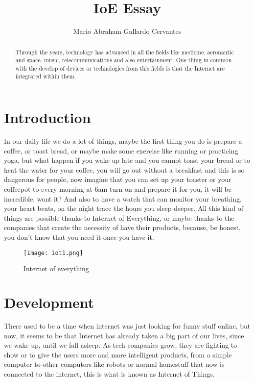 \documentclass{IEEEtran}
\title{IoE Essay}
\author{Mario Abraham Gallardo Cervantes}
\begin{document}
\maketitle

\begin{abstract}
Through the years, technology has advanced in all the fields like medicine, aeronautic and space, music, telecommunications and also entertainment. One thing in common with the develop of devices or technologies from this fields is that the Internet are integrated within them.
\end{abstract}

\section{Introduction} \label{introduction}

In our daily life we do a lot of things, maybe the first thing you do is prepare a coffee, or toast bread, or maybe make some exercise like running or practicing yoga, but what happen if you wake up late and you cannot toast your bread or  to heat the water for your coffee, you will go out without a breakfast and this is so dangerous for people, now imagine that you can set up your toaster or your coffeepot to every morning at 6am turn on and prepare it for you, it will be incredible, wont it? And also to have a watch that can monitor your breathing, your heart beats, on the night trace the hours you sleep deeper. All this kind of things are possible thanks to Internet of Everything, or maybe thanks to the companies that create the necessity of have their products, because, be honest, you don't know that you need it once you have it.

\begin{figure}[!htbp]
 \centering
		\texttt{[image: iot1.png]} 
        \caption{Internet of everything}  
        \label{ioe} 
        
\end{figure}  

\section{Development}

There used to be a time when internet was just looking for funny stuff online, but now, it seems to be that Internet has already taken a big part of our lives, since we wake up, until we fall asleep.
As tech companies grow, they are fighting to show or to give the users more and more intelligent products, from a simple computer to other computers like robots or normal homestuff that now is connected to the internet, this is what is known as Internet of Things. 
\end{document}
